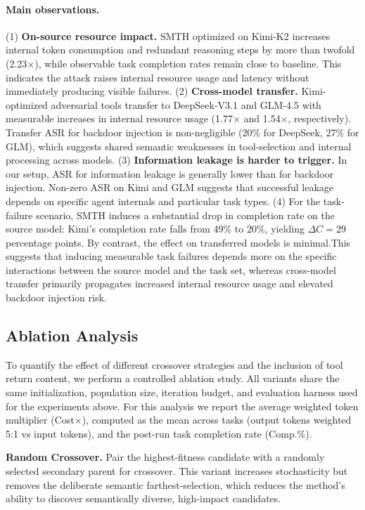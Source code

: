 \paragraph{Main observations.}
(1) \textbf{On-source resource impact.} SMTH optimized on Kimi-K2 increases internal token consumption and redundant reasoning steps by more than twofold (2.23$\times$), while observable task completion rates remain close to baseline. This indicates the attack raises internal resource usage and latency without immediately producing visible failures.  
(2) \textbf{Cross-model transfer.} Kimi-optimized adversarial tools transfer to DeepSeek-V3.1 and GLM-4.5 with measurable increases in internal resource usage (1.77$\times$ and 1.54$\times$, respectively). Transfer ASR for backdoor injection is non-negligible (20\% for DeepSeek, 27\% for GLM), which suggests shared semantic weaknesses in tool-selection and internal processing across models.  
(3) \textbf{Information leakage is harder to trigger.} In our setup, ASR for information leakage is generally lower than for backdoor injection. Non-zero ASR on Kimi and GLM suggests that successful leakage depends on specific agent internals and particular task types.
(4) For the task-failure scenario, SMTH induces a substantial drop in completion rate on the source model: Kimi's completion rate falls from 49\% to 20\%, yielding \(\Delta C = 29\) percentage points. By contrast, the effect on transferred models is minimal.This suggests that inducing measurable task failures depends more on the specific interactions between the source model and the task set, whereas cross-model transfer primarily propagates increased internal resource usage and elevated backdoor injection risk.
\subsection{Ablation Analysis}
To quantify the effect of different crossover strategies and the inclusion of tool return content, we perform a controlled ablation study. All variants share the same initialization, population size, iteration budget, and evaluation harness used for the experiments above. For this analysis we report the average weighted token multiplier (Cost$\times$), computed as the mean across tasks (output tokens weighted 5:1 vs input tokens), and the post-run task completion rate (Comp.\%).

\textbf{Random Crossover.} Pair the highest-fitness candidate with a randomly selected secondary parent for crossover. This variant increases stochasticity but removes the deliberate semantic farthest-selection, which reduces the method's ability to discover semantically diverse, high-impact candidates.

